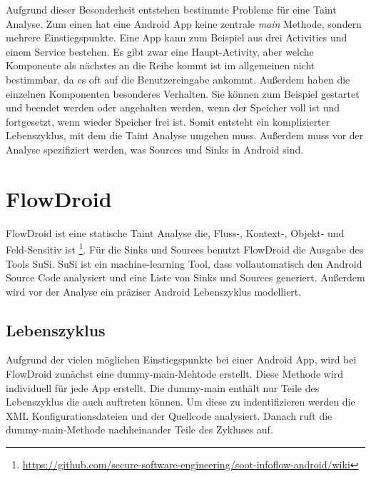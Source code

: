 \documentclass[runningheads]{llncs}
\begin{document}
Aufgrund dieser Besonderheit entstehen bestimmte Probleme für eine Taint Analyse. Zum einen hat eine Android App keine zentrale \emph{main} Methode, sondern mehrere Einstiegspunkte. Eine App kann zum Beispiel aus drei Activities und einem Service bestehen. Es gibt zwar eine Haupt-Activity, aber welche Komponente als nächstes an die Reihe kommt ist im allgemeinen nicht bestimmbar, da es oft auf die Benutzereingabe ankommt. Außerdem haben die einzelnen Komponenten besonderes Verhalten. Sie können zum Beispiel gestartet und beendet werden oder angehalten werden, wenn der Speicher voll ist und fortgesetzt, wenn wieder Speicher frei ist. Somit entsteht ein komplizierter Lebenszyklus, mit dem die Taint Analyse umgehen muss. Außerdem muss vor der Analyse spezifiziert werden, was Sources und Sinks in Android sind.

\section{FlowDroid}
FlowDroid ist eine statische Taint Analyse die, Fluss-, Kontext-, Objekt- und Feld-Sensitiv ist \footnote{\url{https://github.com/secure-software-engineering/soot-infoflow-android/wiki}}.
Für die Sinks und Sources benutzt FlowDroid die Ausgabe des Tools SuSi. SuSi ist ein machine-learning Tool, dass vollautomatisch den Android Source Code analysiert und eine Liste von Sinks und Sources generiert. Außerdem wird vor der Analyse ein präziser Android Lebenszyklus modelliert.
\subsection{Lebenszyklus}
Aufgrund der vielen möglichen Einstiegspunkte bei einer Android App, wird bei FlowDroid zunächst eine dummy-main-Mehtode erstellt. Diese Methode wird individuell für jede App erstellt. Die dummy-main enthält nur Teile des Lebenszyklus die auch auftreten können. Um diese zu indentifizieren werden die XML Konfigurationsdateien und der Quellcode analysiert. Danach ruft die dummy-main-Methode nachheinander Teile des Zykluses auf.
\end{document}
